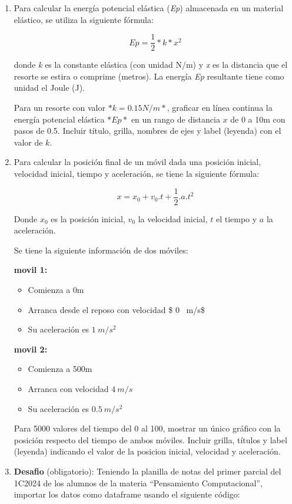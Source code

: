 \documentclass[
  letterpaper,
  DIV=11,
  numbers=noendperiod]{scrreprt}
\providecommand{\tightlist}{%
  \setlength{\itemsep}{0pt}\setlength{\parskip}{0pt}}\usepackage{longtable,booktabs,array}
\begin{document}
\begin{enumerate}
\def\labelenumi{\arabic{enumi}.}
\setcounter{enumi}{4}
\item
  Para calcular la energía potencial elástica (\emph{Ep}) almacenada en
  un material elástico, se utiliza la siguiente fórmula:

  \[
   Ep = \frac{1}{2}*k*x^{2}
   \]

  donde \emph{k} es la constante elástica (con unidad N/m) y \emph{x} es
  la distancia que el resorte se estira o comprime (metros). La energía
  \emph{Ep} resultante tiene como unidad el Joule (J).

  Para un resorte con valor \(*k=0.15 N/m*\), graficar en línea continua
  la energía potencial elástica \(*Ep*\) en un rango de distancia \(x\)
  de 0 a 10m con pasos de 0.5. Incluir título, grilla, nombres de ejes y
  label (leyenda) con el valor de \(k\).
\item
  Para calcular la posición final de un móvil dada una posición inicial,
  velocidad inicial, tiempo y aceleración, se tiene la siguiente
  fórmula:

  \[
   x = x_0+v_0 . t + \frac{1}{2}.a.t^2
   \]

  Donde \(x_0\) es la posición inicial, \(v_0\) la velocidad inicial,
  \(t\) el tiempo y \(a\) la aceleración.

  Se tiene la siguiente información de dos móviles:

  \textbf{movil 1:}

  \begin{itemize}
  \tightlist
  \item
    Comienza a 0m
  \item
    Arranca desde el reposo con velocidad \$ 0 ~m/s\$
  \item
    Su aceleración es \(1 \ m/s^2\)
  \end{itemize}

  \textbf{movil 2:}

  \begin{itemize}
  \tightlist
  \item
    Comienza a 500m
  \item
    Arranca con velocidad \(4 \ m/s\)
  \item
    Su aceleración es \(0.5 \ m/s^2\)
  \end{itemize}

  Para 5000 valores del tiempo del 0 al 100, mostrar un único gráfico
  con la posición respecto del tiempo de ambos móviles. Incluir grilla,
  títulos y label (leyenda) indicando el valor de la posicion inicial,
  velocidad y aceleración.
\item
  \textbf{Desafio} (obligatorio): Teniendo la planilla de notas del
  primer parcial del 1C2024 de los alumnos de la materia ``Pensamiento
  Computacional'', importar los datos como dataframe usando el siguiente
  código:


\end{enumerate}
\end{document}
